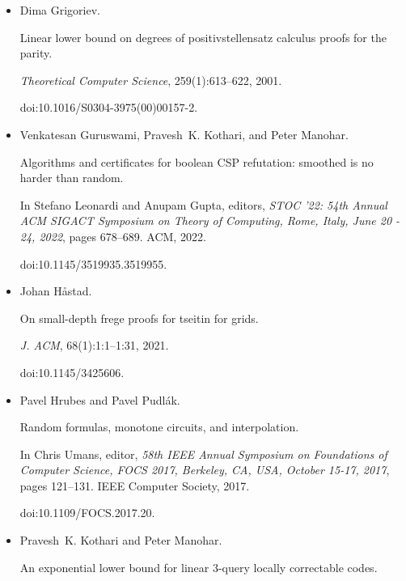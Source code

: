 \begin{itemize}
\item[] 
[22]

Dima Grigoriev.


Linear lower bound on degrees of positivstellensatz calculus proofs
for the parity.


\emph{Theoretical Computer Science}, 259(1):613–622, 2001.


doi:10.1016/S0304-3975(00)00157-2.





\item[] 
[23]

Venkatesan Guruswami, Pravesh K. Kothari, and Peter Manohar.


Algorithms and certificates for boolean CSP refutation: smoothed is
no harder than random.


In Stefano Leonardi and Anupam Gupta, editors, \emph{STOC ’22: 54th
Annual ACM SIGACT Symposium on Theory of Computing, Rome, Italy, June 20
- 24, 2022}, pages 678–689. ACM, 2022.


doi:10.1145/3519935.3519955.





\item[] 
[24]

Johan Håstad.


On small-depth frege proofs for tseitin for grids.


\emph{J. ACM}, 68(1):1:1–1:31, 2021.


doi:10.1145/3425606.





\item[] 
[25]

Pavel Hrubes and Pavel Pudlák.


Random formulas, monotone circuits, and interpolation.


In Chris Umans, editor, \emph{58th IEEE Annual Symposium on
Foundations of Computer Science, FOCS 2017, Berkeley, CA, USA, October
15-17, 2017}, pages 121–131. IEEE Computer Society, 2017.


doi:10.1109/FOCS.2017.20.





\item[] 
[26]

Pravesh K. Kothari and Peter Manohar.


An exponential lower bound for linear 3-query locally correctable
codes.



\end{itemize}
